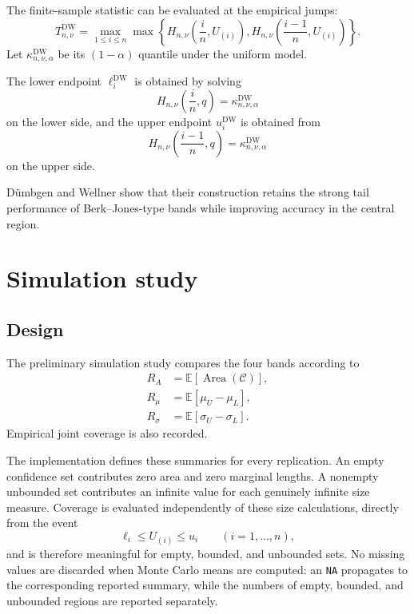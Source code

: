 \documentclass[11pt]{article}
\newcommand{\Ee}{\mathbb{E}}
\newcommand{\cC}{\mathcal{C}}
\begin{document}
The finite-sample statistic can be evaluated at the empirical jumps:
\begin{equation}
    T_{n,\nu}^{\mathrm{DW}}
    =
    \max_{1\leq i\leq n}
    \max
    \left\{
        H_{n,\nu}
        \left(
            \frac{i}{n},U_{(i)}
        \right),
        H_{n,\nu}
        \left(
            \frac{i-1}{n},U_{(i)}
        \right)
    \right\}.
\end{equation}
Let $\kappa_{n,\nu,\alpha}^{\mathrm{DW}}$ be its
$(1-\alpha)$ quantile under the uniform model.

The lower endpoint $\ell_i^{\mathrm{DW}}$ is obtained by solving
\begin{equation}
    H_{n,\nu}
    \left(
        \frac{i}{n},q
    \right)
    =
    \kappa_{n,\nu,\alpha}^{\mathrm{DW}}
\end{equation}
on the lower side, and the upper endpoint $u_i^{\mathrm{DW}}$ is
obtained from
\begin{equation}
    H_{n,\nu}
    \left(
        \frac{i-1}{n},q
    \right)
    =
    \kappa_{n,\nu,\alpha}^{\mathrm{DW}}
\end{equation}
on the upper side.

Dümbgen and Wellner show that their construction retains the strong
tail performance of Berk--Jones-type bands while improving accuracy in
the central region.


\section{Simulation study}

\subsection{Design}

The preliminary simulation study compares the four bands according to
\begin{align}
    R_A
    &=
    \Ee[
        \operatorname{Area}(\cC)
    ],
    \\
    R_\mu
    &=
    \Ee[
        \mu_U-\mu_L
    ],
    \\
    R_\sigma
    &=
    \Ee[
        \sigma_U-\sigma_L
    ].
\end{align}
Empirical joint coverage is also recorded.

The implementation defines these summaries for every replication.
An empty confidence set contributes zero area and zero marginal
lengths.  A nonempty unbounded set contributes an infinite value for
each genuinely infinite size measure.  Coverage is evaluated
independently of these size calculations, directly from the event
\[
    \ell_i\leq U_{(i)}\leq u_i
    \qquad(i=1,\ldots,n),
\]
and is therefore meaningful for empty, bounded, and unbounded sets.
No missing values are discarded when Monte Carlo means are computed:
an \texttt{NA} propagates to the corresponding reported summary, while
the numbers of empty, bounded, and unbounded regions are reported
separately.
\end{document}
